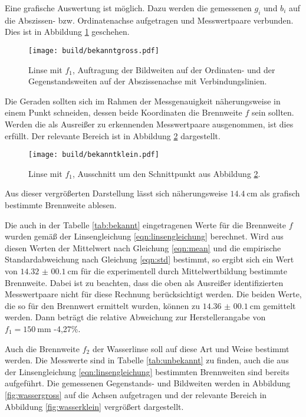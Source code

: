 Eine grafische Auswertung ist möglich. Dazu werden die gemessenen $g_i$ und
$b_i$ auf die Abszissen- bzw. Ordinatenachse aufgetragen und Messwertpaare verbunden.
Dies ist in Abbildung \ref{fig:bekanntgross} geschehen.

\begin{figure}%
  \centering
  \texttt{[image: build/bekanntgross.pdf]}
  \caption{Linse mit $f_1$, Auftragung der Bildweiten auf der Ordinaten- und der Gegenstandsweiten auf der Abszissenachse mit Verbindungslinien.}
  \label{fig:bekanntgross}
\end{figure}

Die Geraden sollten sich im Rahmen der Messgenauigkeit näherungsweise in einem Punkt
schneiden, dessen beide Koordinaten die Brennweite $f$ sein sollten.
Werden die als Ausreißer zu erkennenden Messwertpaare ausgenommen, ist dies
erfüllt. Der relevante Bereich ist in Abbildung \ref{fig:bekanntklein} dargestellt.

\begin{figure}%
  \centering
  \texttt{[image: build/bekanntklein.pdf]}
  \caption{Linse mit $f_1$, Ausschnitt um den Schnittpunkt aus Abbildung \ref{fig:bekanntklein}.}
  \label{fig:bekanntklein}
\end{figure}

Aus dieser vergrößerten Darstellung lässt sich näherungsweise $\SI{14.4}{\centi\meter}$ als grafisch
bestimmte Brennweite ablesen.

Die auch in der Tabelle \ref{tab:bekannt} eingetragenen Werte für die Brennweite $f$ wurden gemäß der
Linsengleichung \eqref{eqn:linsengleichung} berechnet. Wird aus diesen Werten
der Mittelwert nach Gleichung \eqref{eqn:mean} und die empirische Standardabweichung
nach Gleichung \eqref{eqn:std} bestimmt, so ergibt sich ein Wert von $\SI{14.32(0010)}{\centi\meter}$
für die experimentell durch Mittelwertbildung bestimmte Brennweite. Dabei ist zu
beachten, dass die oben als Ausreißer identifizierten Messwertpaare nicht für diese Rechnung
berücksichtigt werden. Die beiden Werte, die so für den Brennwert ermittelt wurden,
können zu $\SI{14.36(0010)}{\centi\meter}$
gemittelt werden. Dann beträgt die relative Abweichung zur Herstellerangabe von
$f_1 = \SI{150}{\milli\meter}$ -4,27\%.

Auch die Brennweite $f_2$ der Wasserlinse soll auf diese Art und Weise bestimmt werden.
Die Messwerte sind in Tabelle \ref{tab:unbekannt} zu finden, auch die aus der Linsengleichung \eqref{eqn:linsengleichung}
bestimmten Brennweiten sind bereits aufgeführt.
Die gemessenen Gegenstands- und Bildweiten werden in Abbildung \ref{fig:wassergross} auf die Achsen aufgetragen
und der relevante Bereich in Abbildung \ref{fig:wasserklein} vergrößert dargestellt.

